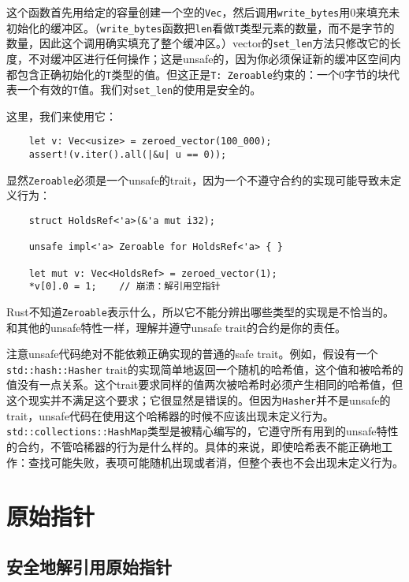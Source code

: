 这个函数首先用给定的容量创建一个空的\texttt{Vec}，然后调用\texttt{write\_bytes}用0来填充未初始化的缓冲区。（\texttt{write\_bytes}函数把\texttt{len}看做\texttt{T}类型元素的数量，而不是字节的数量，因此这个调用确实填充了整个缓冲区。）vector的\texttt{set\_len}方法只修改它的长度，不对缓冲区进行任何操作；这是unsafe的，因为你必须保证新的缓冲区空间内都包含正确初始化的\texttt{T}类型的值。但这正是\texttt{T: Zeroable}约束的：一个0字节的块代表一个有效的\texttt{T}值。我们对\texttt{set\_len}的使用是安全的。

这里，我们来使用它：
\begin{verbatim}
    let v: Vec<usize> = zeroed_vector(100_000);
    assert!(v.iter().all(|&u| u == 0));
\end{verbatim}

显然\texttt{Zeroable}必须是一个unsafe的trait，因为一个不遵守合约的实现可能导致未定义行为：
\begin{verbatim}
    struct HoldsRef<'a>(&'a mut i32);

    unsafe impl<'a> Zeroable for HoldsRef<'a> { }

    let mut v: Vec<HoldsRef> = zeroed_vector(1);
    *v[0].0 = 1;    // 崩溃：解引用空指针
\end{verbatim}

Rust不知道\texttt{Zeroable}表示什么，所以它不能分辨出哪些类型的实现是不恰当的。和其他的unsafe特性一样，理解并遵守unsafe trait的合约是你的责任。

注意unsafe代码绝对不能依赖正确实现的普通的safe trait。例如，假设有一个\texttt{std::hash::Hasher} trait的实现简单地返回一个随机的哈希值，这个值和被哈希的值没有一点关系。这个trait要求同样的值两次被哈希时必须产生相同的哈希值，但这个现实并不满足这个要求；它很显然是错误的。但因为\texttt{Hasher}并不是unsafe的trait，unsafe代码在使用这个哈稀器的时候不应该出现未定义行为。\texttt{std::collections::HashMap}类型是被精心编写的，它遵守所有用到的unsafe特性的合约，不管哈稀器的行为是什么样的。具体的来说，即使哈希表不能正确地工作：查找可能失败，表项可能随机出现或者消，但整个表也不会出现未定义行为。

\section{原始指针}\label{rawp}

\subsection{安全地解引用原始指针}\label{DerefRawP}